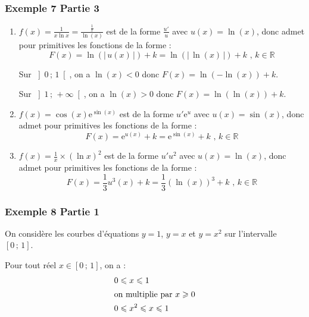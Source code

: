 \documentclass[11pt, hyperref={urlcolor=red,%
            linkcolor=blue, %
            colorlinks=true}]{beamer}
\newcommand{\R}{\mathbb{R}}
\newcommand{\Interoo}[2]{\left]#1\, ;\, #2\right[}
\newcommand{\Interff}[2]{\left[#1\, ;\, #2\right]}
\newcommand{\valabs}[1]{\big| \, #1 \, \big|}
\begin{document}
\begin{frame}
\frametitle{Exemple 7 Partie 3}

\begin{enumerate}

 \item   $f(x)=\frac{1}{x \ln x}=\frac{\frac{1}{x}}{\ln(x)}$    est de la forme $\frac{u'}{u}$ avec $u(x)=\ln(x)$, donc admet pour primitives les fonctions de la forme :
 $$F(x)=\ln(\valabs{u(x)}) +k=\ln(\valabs{\ln(x)})  +  k    \text{ , } k \in \R$$
 
 Sur $\Interoo{0}{1}$, on a $\ln(x)<0$ donc $F(x)=\ln(-\ln(x))  +  k$.
 
  Sur $\Interoo{1}{+\infty}$, on a $\ln(x)>0$ donc $F(x)=\ln(\ln(x))  +  k$.

 \item   $f(x)=\cos(x)\text{e}^{\sin(x)}$    est de la forme $u'\text{e}^{u}$ avec $u(x)=\sin(x)$, donc admet pour primitives les fonctions de la forme :
 $$F(x)=\text{e}^{u(x)} +k=\text{e}^{\sin(x)} +k    \text{ , } k \in \R$$
 
 
 \item   $f(x)=\frac{1}{x}\times \left(\ln x\right)^2$    est de la forme $u'u^{2}$ avec $u(x)=\ln(x)$, donc admet pour primitives les fonctions de la forme :
 $$F(x)=\frac{1}{3}u^{3}(x)+k=\frac{1}{3}(\ln(x))^{3} +k    \text{ , } k \in \R$$
 

			
\end{enumerate}

\end{frame}



\begin{frame}
\frametitle{Exemple 8 Partie 1}
\label{exemple8}
On considère les  courbes d'équations $y=1$, $y=x$ et $y=x^2$ sur l'intervalle $\Interff{0}{1}$.

Pour tout réel $x \in \Interff{0}{1}$, on a :
\begin{align*}
0 & \leqslant x \leqslant  1 \\
\intertext{on multiplie par $x \geqslant 0$}
0 & \leqslant x^{2}   \leqslant x  \leqslant 1
\end{align*}




\end{frame}
\end{document}
